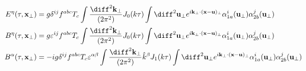 \begin{align}
	E^\eta (\tau,\mathbf{x}_\perp) & = g \delta^{ij} f^{abc} T_c \int  \frac{\diff^2 \mathbf{k}_\perp}{(2\pi^2)} J_0 (k \tau) \int \diff^2 \mathbf{u}_\perp e^{i \mathbf{k}_\perp \cdot (\mathbf{x} - \mathbf{u})_\perp} \alpha^i_{1a} (\mathbf{u}_\perp) \alpha^j_{2b}(\mathbf{u}_\perp) \\
	B^\eta (\tau,\mathbf{x}_\perp) & = g \varepsilon^{ij} f^{abc} T_c \int  \frac{\diff^2 \mathbf{k}_\perp}{(2\pi^2)} J_0 (k \tau) \int \diff^2 \mathbf{u}_\perp e^{i \mathbf{k}_\perp \cdot (\mathbf{x} - \mathbf{u})_\perp} \alpha^i_{1a} (\mathbf{u}_\perp) \alpha^j_{2b}(\mathbf{u}_\perp) \\
	B^\alpha (\tau,\mathbf{x}_\perp) & = -ig \delta^{ij} f^{abc} T_c \varepsilon^{\alpha \beta} \int  \frac{\diff^2 \mathbf{k}_\perp}{(2\pi^2)} \hat{k}^\beta J_1 (k \tau) \int \diff^2 \mathbf{u}_\perp e^{i \mathbf{k}_\perp \cdot (\mathbf{x} - \mathbf{u})_\perp} \alpha^i_{1a} (\mathbf{u}_\perp) \alpha^j_{2b}(\mathbf{u}_\perp)
\end{align}
